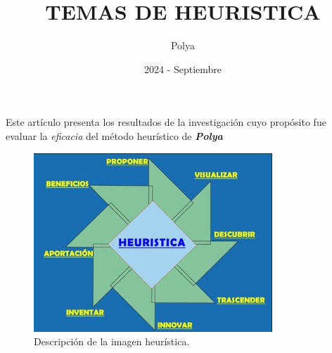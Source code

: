 \documentclass[12pt, letterpaper]{article}
\title{TEMAS DE HEURISTICA}
\author{Polya}
\date{2024 - Septiembre}
\begin{document}
\maketitle
Este artículo presenta los resultados de la
investigación cuyo propósito fue evaluar
la \emph{eficacia} del método heurístico de \textbf{\textit{Polya}}
\begin{figure}[ht] %
    \centering %
    \includegraphics[width=0.8\textwidth]{heuristica.jpg} %
    \caption{Descripción de la imagen heurística.} %
    \label{fig:heuristica} %
\end{figure}
\end{document}
